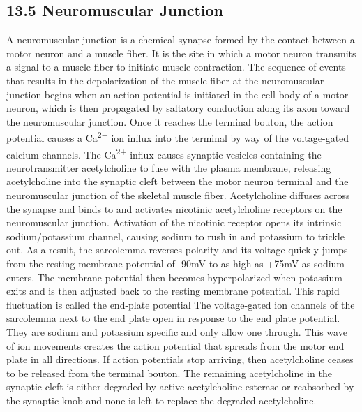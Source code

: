 \hypertarget{neuromuscular-junction}{%
\subsection{\texorpdfstring{{13.5} Neuromuscular
Junction}{13.5 Neuromuscular Junction}}\label{neuromuscular-junction}}

A neuromuscular junction is a chemical synapse formed by the contact
between a motor neuron and a muscle fiber. It is the site in which a
motor neuron transmits a signal to a muscle fiber to initiate muscle
contraction. The sequence of events that results in the depolarization
of the muscle fiber at the neuromuscular junction begins when an action
potential is initiated in the cell body of a motor neuron, which is then
propagated by saltatory conduction along its axon toward the
neuromuscular junction. Once it reaches the terminal bouton, the action
potential causes a Ca\textsuperscript{2+} ion influx into the terminal
by way of the voltage-gated calcium channels. The Ca\textsuperscript{2+}
influx causes synaptic vesicles containing the neurotransmitter
acetylcholine to fuse with the plasma membrane, releasing acetylcholine
into the synaptic cleft between the motor neuron terminal and the
neuromuscular junction of the skeletal muscle fiber. Acetylcholine
diffuses across the synapse and binds to and activates nicotinic
acetylcholine receptors on the neuromuscular junction. Activation of the
nicotinic receptor opens its intrinsic sodium/potassium channel, causing
sodium to rush in and potassium to trickle out. As a result, the
sarcolemma reverses polarity and its voltage quickly jumps from the
resting membrane potential of -90mV to as high as +75mV as sodium
enters. The membrane potential then becomes hyperpolarized when
potassium exits and is then adjusted back to the resting membrane
potential. This rapid fluctuation is called the end-plate potential The
voltage-gated ion channels of the sarcolemma next to the end plate open
in response to the end plate potential. They are sodium and potassium
specific and only allow one through. This wave of ion movements creates
the action potential that spreads from the motor end plate in all
directions. If action potentials stop arriving, then acetylcholine
ceases to be released from the terminal bouton. The remaining
acetylcholine in the synaptic cleft is either degraded by active
acetylcholine esterase or reabsorbed by the synaptic knob and none is
left to replace the degraded acetylcholine.

